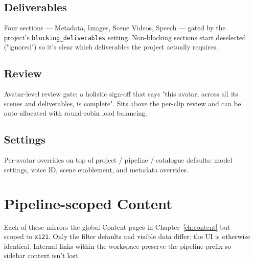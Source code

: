 
\subsection{Deliverables}
Four sections — Metadata, Images, Scene Videos, Speech — gated by the project's
\texttt{blocking\_deliverables} setting. Non-blocking sections start deselected
("ignored") so it's clear which deliverables the project actually requires.

\subsection{Review}
Avatar-level review gate: a holistic sign-off that says "this avatar, across all
its scenes and deliverables, is complete". Sits above the per-clip review and
can be auto-allocated with round-robin load balancing.


\subsection{Settings}
Per-avatar overrides on top of project / pipeline / catalogue defaults:
model settings, voice ID, scene enablement, and metadata overrides.

\section{Pipeline-scoped Content}
\label{sec:ws-content}

Each of these mirrors the global Content pages in Chapter~\ref{ch:content}
but scoped to \texttt{x121}. Only the filter defaults and visible data
differ; the UI is otherwise identical. Internal links within the workspace
preserve the pipeline prefix so sidebar context isn't lost.


